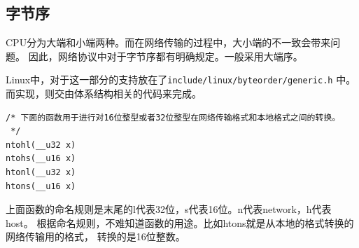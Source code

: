 \documentclass[11pt, a4paper,oneside]{book}
\theoremstyle{ocrenumbox}
\theoremstyle{purplenumbox}
\theoremstyle{blackbox}
\begin{document}
\subsection{字节序}
CPU分为大端和小端两种。而在网络传输的过程中，大小端的不一致会带来问题。
因此，网络协议中对于字节序都有明确规定。一般采用大端序。

Linux中，对于这一部分的支持放在了\texttt{include/linux/byteorder/generic.h}
中。而实现，则交由体系结构相关的代码来完成。

\begin{verbatim}
/* 下面的函数用于进行对16位整型或者32位整型在网络传输格式和本地格式之间的转换。
 */
ntohl(__u32 x)
ntohs(__u16 x)
htonl(__u32 x)
htons(__u16 x)
\end{verbatim}

上面函数的命名规则是末尾的l代表32位，s代表16位。n代表network，h代表host。
根据命名规则，不难知道函数的用途。比如htons就是从本地的格式转换的网络传输用的格式，
转换的是16位整数。
\end{document}
